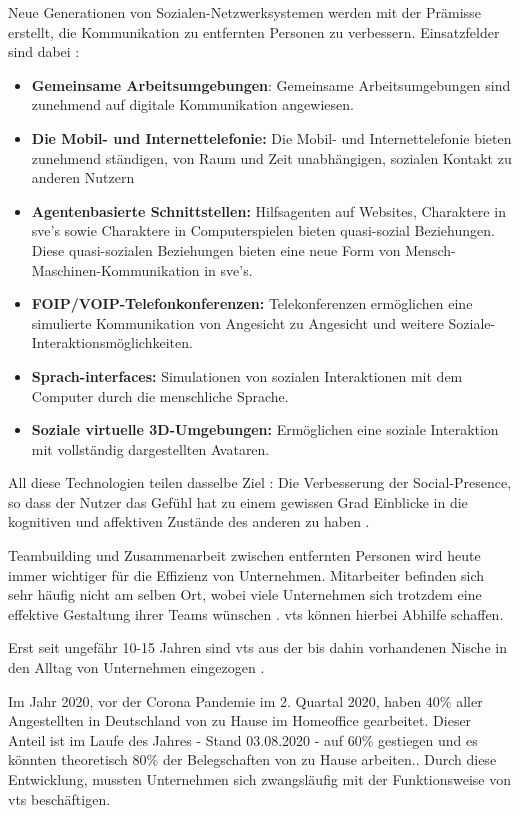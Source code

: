 \documentclass[a4paper,11pt]{article}%
\renewcommand{\\}{\vspace*{0.5\baselineskip} \newline}
\begin{document}
Neue Generationen von Sozialen-Netzwerksystemen werden mit der Prämisse erstellt, die Kommunikation zu entfernten Personen zu verbessern.
Einsatzfelder sind dabei :
\begin{itemize}
	\item{\textbf{Gemeinsame Arbeitsumgebungen}: Gemeinsame Arbeitsumgebungen sind zunehmend auf digitale Kommunikation angewiesen.}
	\item{\textbf{Die Mobil- und Internettelefonie:} Die Mobil- und Internettelefonie bieten zunehmend ständigen, von Raum und Zeit unabhängigen, sozialen Kontakt zu anderen Nutzern}
	\item{\textbf{Agentenbasierte Schnittstellen:} Hilfsagenten auf Websites, Charaktere in \ac{sve}'s sowie Charaktere in Computerspielen bieten \dq{}quasi\dq{}-sozial Beziehungen. Diese \dq{}quasi\dq{}-sozialen Beziehungen bieten eine neue Form von Mensch-Maschinen-Kommunikation in \ac{sve}'s.} 
	\item{\textbf{FOIP/VOIP-Telefonkonferenzen:} Telekonferenzen ermöglichen eine simulierte Kommunikation von Angesicht zu Angesicht und weitere Soziale-Interaktionsmöglichkeiten.}
	\item{\textbf{Sprach-interfaces:} Simulationen von sozialen Interaktionen mit dem Computer durch die menschliche Sprache.}
	\item{\textbf{Soziale virtuelle 3D-Umgebungen:} Ermöglichen eine soziale Interaktion mit vollständig dargestellten Avataren.}
\end{itemize}

All diese Technologien teilen dasselbe Ziel : \\ \dq{}Die Verbesserung der \dq{}Social-Presence\dq{}, so dass der Nutzer das Gefühl hat zu einem gewissen Grad Einblicke in die kognitiven und affektiven Zustände des anderen zu haben \dq{} \citep{biocca2002defining} \citep[p.407–447]{biocca2001plugging}.

Teambuilding und Zusammenarbeit zwischen entfernten Personen wird heute immer wichtiger für die Effizienz von Unternehmen. Mitarbeiter befinden sich sehr häufig nicht am selben Ort, wobei viele Unternehmen sich trotzdem eine effektive Gestaltung ihrer Teams wünschen \citep[p.791-792]{jarvenpaa1999communication}. \ac{vts} können hierbei Abhilfe schaffen. 
	
Erst seit ungefähr 10-15 Jahren sind \ac{vts} aus der bis dahin vorhandenen Nische in den Alltag von Unternehmen eingezogen \citep{gilson2015virtual}.

Im Jahr 2020, vor der Corona Pandemie im 2. Quartal 2020, haben 40\% aller Angestellten in Deutschland von zu Hause im \dq{}Homeoffice\dq{} gearbeitet. Dieser Anteil ist im Laufe des Jahres - Stand 03.08.2020 - auf 60\% gestiegen und es könnten theoretisch 80\% der Belegschaften von zu Hause arbeiten.\citep{statistaCorona2020}. Durch diese Entwicklung, mussten Unternehmen sich zwangsläufig mit der Funktionsweise von \ac{vts} beschäftigen.
\end{document}
